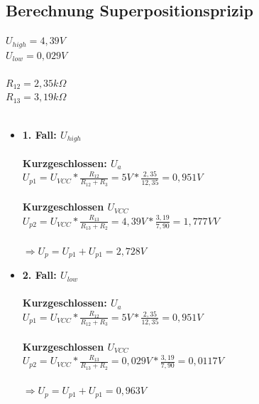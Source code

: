 \subsection{Berechnung Superpositionsprizip}
$U_{high}=4,39V$ \\
$U_{low}=0,029V$ \\ \\
$R_{12}=2,35k\Omega$ \\
$R_{13}=3,19k\Omega$ \\ \\
\begin{itemize}
  \item \textbf{1. Fall: $U_{high}$} \\ \\
        \textbf{Kurzgeschlossen: $U_a$ }\\
        $U_{p1} = U_{VCC}*\frac{R_{12}}{R_{12}+R_3} = 5V * \frac{2,35}{12,35} = 0,951V$ \\ \\
        \textbf{Kurzgeschlossen $U_{VCC}$}\\
        $U_{p2} = U_{VCC}*\frac{R_{13}}{R_{13}+R_2} = 4,39V * \frac{3,19}{7,90} = 1,777VV$ \\ \\
        $\Rightarrow U_p = U_{p1} + U_{p1} = 2,728V$

  \item \textbf{2. Fall: $U_{low}$} \\ \\
        \textbf{Kurzgeschlossen: $U_a$ }\\
        $U_{p1} = U_{VCC}*\frac{R_{12}}{R_{12}+R_3} = 5V * \frac{2,35}{12,35} = 0,951V$ \\ \\
        \textbf{Kurzgeschlossen $U_{VCC}$}\\
        $U_{p2} = U_{VCC}*\frac{R_{13}}{R_{13}+R_2} = 0,029V * \frac{3,19}{7,90} = 0,0117V$ \\ \\
        $\Rightarrow U_p = U_{p1} + U_{p1} = 0,963V$
\end{itemize}


